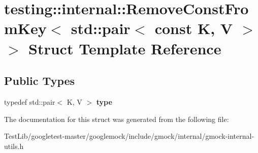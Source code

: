 \hypertarget{structtesting_1_1internal_1_1RemoveConstFromKey_3_01std_1_1pair_3_01const_01K_00_01V_01_4_01_4}{}\section{testing\+:\+:internal\+:\+:Remove\+Const\+From\+Key$<$ std\+:\+:pair$<$ const K, V $>$ $>$ Struct Template Reference}
\label{structtesting_1_1internal_1_1RemoveConstFromKey_3_01std_1_1pair_3_01const_01K_00_01V_01_4_01_4}
\subsection*{Public Types}
\begin{DoxyCompactItemize}
\item 
\mbox{\label{structtesting_1_1internal_1_1RemoveConstFromKey_3_01std_1_1pair_3_01const_01K_00_01V_01_4_01_4_ac1d76274964aa8172889a4714246e86f}} 
typedef std\+::pair$<$ K, V $>$ {\bfseries type}
\end{DoxyCompactItemize}


The documentation for this struct was generated from the following file\+:\begin{DoxyCompactItemize}
\item 
Test\+Lib/googletest-\/master/googlemock/include/gmock/internal/gmock-\/internal-\/utils.\+h\end{DoxyCompactItemize}
